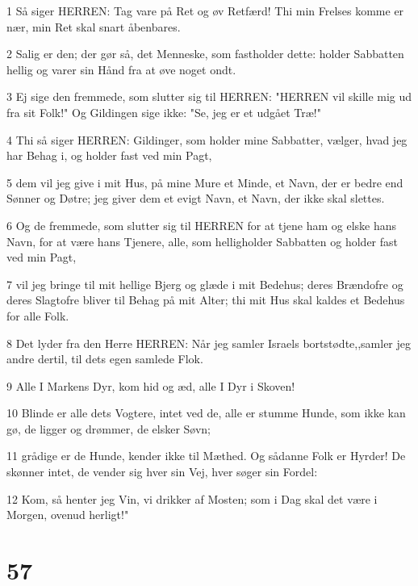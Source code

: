 \par 1 Så siger HERREN: Tag vare på Ret og øv Retfærd! Thi min Frelses komme er nær, min Ret skal snart åbenbares.
\par 2 Salig er den; der gør så, det Menneske, som fastholder dette: holder Sabbatten hellig og varer sin Hånd fra at øve noget ondt.
\par 3 Ej sige den fremmede, som slutter sig til HERREN: "HERREN vil skille mig ud fra sit Folk!" Og Gildingen sige ikke: "Se, jeg er et udgået Træ!"
\par 4 Thi så siger HERREN: Gildinger, som holder mine Sabbatter, vælger, hvad jeg har Behag i, og holder fast ved min Pagt,
\par 5 dem vil jeg give i mit Hus, på mine Mure et Minde, et Navn, der er bedre end Sønner og Døtre; jeg giver dem et evigt Navn, et Navn, der ikke skal slettes.
\par 6 Og de fremmede, som slutter sig til HERREN for at tjene ham og elske hans Navn, for at være hans Tjenere, alle, som helligholder Sabbatten og holder fast ved min Pagt,
\par 7 vil jeg bringe til mit hellige Bjerg og glæde i mit Bedehus; deres Brændofre og deres Slagtofre bliver til Behag på mit Alter; thi mit Hus skal kaldes et Bedehus for alle Folk.
\par 8 Det lyder fra den Herre HERREN: Når jeg samler Israels bortstødte,,samler jeg andre dertil, til dets egen samlede Flok.
\par 9 Alle I Markens Dyr, kom hid og æd, alle I Dyr i Skoven!
\par 10 Blinde er alle dets Vogtere, intet ved de, alle er stumme Hunde, som ikke kan gø, de ligger og drømmer, de elsker Søvn;
\par 11 grådige er de Hunde, kender ikke til Mæthed. Og sådanne Folk er Hyrder! De skønner intet, de vender sig hver sin Vej, hver søger sin Fordel:
\par 12 Kom, så henter jeg Vin, vi drikker af Mosten; som i Dag skal det være i Morgen, ovenud herligt!"

\chapter{57}

